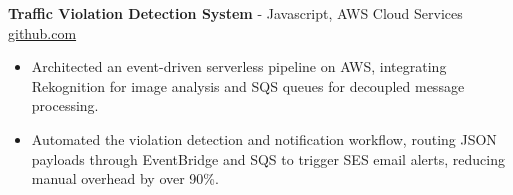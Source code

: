 \documentclass[11pt]{article}       %
\begin{document}

\textbf{Traffic Violation Detection System}{ - Javascript, AWS Cloud Services} \hfill \href{https://github.com/Monica20030707/AWS_rekonigition-N-read-database}{github.com} \\
\vspace{-9pt}
\begin{itemize}
  \item Architected an event-driven serverless pipeline on AWS, integrating Rekognition for image analysis and SQS queues for decoupled message processing.
  \item Automated the violation detection and notification workflow, routing JSON payloads through EventBridge and SQS to trigger SES email alerts, reducing manual overhead by over 90\%.
\end{itemize}
\end{document}
